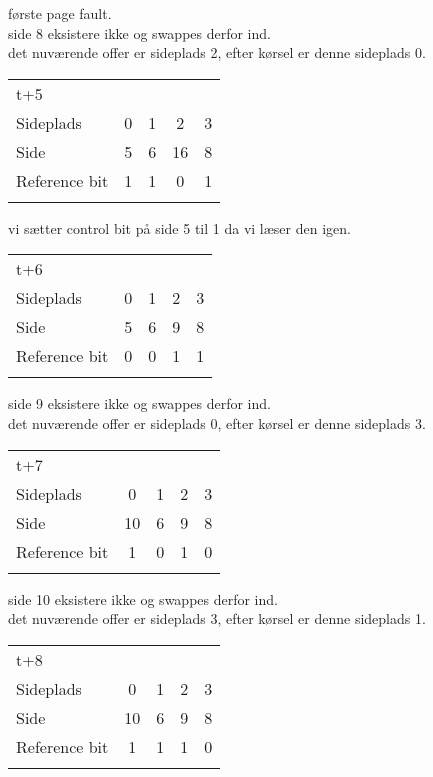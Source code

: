 \documentclass[titlepage]{article}
\begin{document}
første page fault.\\
side 8 eksistere ikke og swappes derfor ind.\\
det nuværende offer er sideplads 2, efter kørsel er denne sideplads 0.\\

\begin{tabular}{l | c | c | c | c}
t+5\\
Sideplads    & 0 & 1 & 2 & 3\\
Side         & 5 & 6 & 16 & 8\\
Reference bit & 1 & 1 & 0 & 1\\\\
\end{tabular}

vi sætter control bit på side 5 til 1 da vi læser den igen.\\

\begin{tabular}{l | c | c | c | c}
t+6\\
Sideplads    & 0 & 1 & 2 & 3\\
Side         & 5 & 6 & 9 & 8\\
Reference bit & 0 & 0 & 1 & 1\\\\
\end{tabular}

side 9 eksistere ikke og swappes derfor ind.\\
det nuværende offer er sideplads 0, efter kørsel er denne sideplads 3.\\

\begin{tabular}{l | c | c | c | c}
t+7\\
Sideplads    & 0 & 1 & 2 & 3\\
Side         & 10 & 6 & 9 & 8\\
Reference bit & 1 & 0 & 1 & 0\\\\
\end{tabular}

side 10 eksistere ikke og swappes derfor ind.\\
det nuværende offer er sideplads 3, efter kørsel er denne sideplads 1.\\

\begin{tabular}{l | c | c | c | c}
t+8\\
Sideplads    & 0 & 1 & 2 & 3\\
Side         & 10 & 6 & 9 & 8\\
Reference bit & 1 & 1 & 1 & 0\\\\
\end{tabular}
\end{document}
